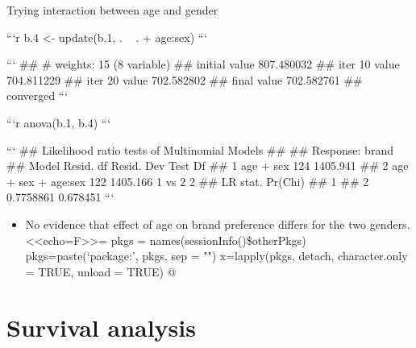 \documentclass[ignorenonframetext,]{beamer}
\providecommand{\tightlist}{%
  \setlength{\itemsep}{0pt}\setlength{\parskip}{0pt}}
\begin{document}
\begin{frame}{Trying interaction between age and gender}
\protect\hypertarget{trying-interaction-between-age-and-gender}{}

\begin{scriptsize}

```r
b.4 <- update(b.1, . ~ . + age:sex)
```

```
## # weights:  15 (8 variable)
## initial  value 807.480032 
## iter  10 value 704.811229
## iter  20 value 702.582802
## final  value 702.582761 
## converged
```

```r
anova(b.1, b.4)
```

```
## Likelihood ratio tests of Multinomial Models
## 
## Response: brand
##                 Model Resid. df Resid. Dev   Test    Df
## 1           age + sex       124   1405.941             
## 2 age + sex + age:sex       122   1405.166 1 vs 2     2
##    LR stat.  Pr(Chi)
## 1                   
## 2 0.7758861 0.678451
```

   
\end{scriptsize}

\begin{itemize}
\tightlist
\item
  No evidence that effect of age on brand preference differs for the two
  genders. \textless{}\textless{}echo=F\textgreater{}\textgreater{}=
  pkgs = names(sessionInfo()\$otherPkgs) pkgs=paste(`package:', pkgs,
  sep = "") x=lapply(pkgs, detach, character.only = TRUE, unload = TRUE)
  @
\end{itemize}

\section{Survival analysis}
\frame{\sectionpage}

\end{frame}
\end{document}
